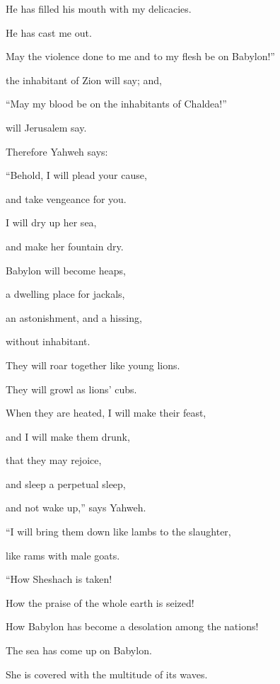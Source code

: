 {\par }{\QB He has filled his mouth with my delicacies.
\par }{\QB He has cast me out.
\par }{\Q {}May the violence done to me and to my flesh be on Babylon!”
\par }{\QB the inhabitant of Zion will say; and,
\par }{\Q “May my blood be on the inhabitants of Chaldea!”
\par }{\QB will Jerusalem say.
\par }{\BB \par }{\PP {}Therefore Yahweh says:
\par }{\Q “Behold, I will plead your cause,
\par }{\QB and take vengeance for you.
\par }{\Q I will dry up her sea,
\par }{\QB and make her fountain dry.
\par }{\Q {}Babylon will become heaps,
\par }{\QB a dwelling place for jackals,
\par }{\QB an astonishment, and a hissing,
\par }{\QB without inhabitant.
\par }{\Q {}They will roar together like young lions.
\par }{\QB They will growl as lions’ cubs.
\par }{\Q {}When they are heated, I will make their feast,
\par }{\QB and I will make them drunk,
\par }{\Q that they may rejoice,
\par }{\QB and sleep a perpetual sleep,
\par }{\QB and not wake up,” says Yahweh.
\par }{\BB \par }{\Q {}“I will bring them down like lambs to the slaughter,
\par }{\QB like rams with male goats.
\par }{\BB \par }{\Q {}“How Sheshach is taken!
\par }{\QB How the praise of the whole earth is seized!
\par }{\QB How Babylon has become a desolation among the nations!
\par }{\Q {}The sea has come up on Babylon.
\par }{\QB She is covered with the multitude of its waves.
}
